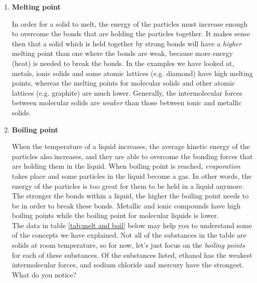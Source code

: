 \begin{enumerate}
  
  \item{\textbf{Melting point}} 


In order for a solid to melt, the energy of the particles must increase enough to overcome the bonds that are holding the particles together. It makes sense then that a solid which is held together by strong bonds will have a \textit{higher} melting point than one where the bonds are weak, because more energy (heat) is needed to break the bonds. In the examples we have looked at, metals, ionic solids and some atomic lattices (e.g. diamond) have high melting points, whereas the melting points for molecular solids and other atomic lattices (e.g. graphite) are much lower. Generally, the intermolecular forces between molecular solids are \textit{weaker} than those between ionic and metallic solids.

  \item{\textbf{Boiling point}} 


When the temperature of a liquid increases, the average kinetic energy of the particles also increases, and they are able to overcome the bonding forces that are holding them in the liquid. When boiling point is reached, \textit{evaporation} takes place and some particles in the liquid become a gas. In other words, the energy of the particles is too great for them to be held in a liquid anymore. The stronger the bonds within a liquid, the higher the boiling point needs to be in order to break these bonds. Metallic and ionic compounds have high boiling points while the boiling point for molecular liquids is lower.\\

The data in table \ref{tab:melt and boil} below may help you to understand some of the concepts we have explained. Not all of the substances in the table are solids at room temperature, so for now, let's just focus on the \textit{boiling points} for each of these substances. Of the substances listed, ethanol has the weakest intermolecular forces, and sodium chloride and mercury have the strongest. What do you notice?


\end{enumerate}
